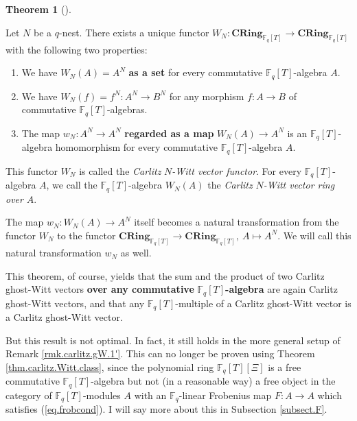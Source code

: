 \documentclass[numbers=enddot,12pt,final,onecolumn,notitlepage]{scrartcl}%
\theoremstyle{definition}
\newtheorem{theo}{Theorem}[section]
\newenvironment{theorem}[1][]
{\begin{theo}[#1]\begin{leftbar}}
{\end{leftbar}\end{theo}}
\begin{document}
\begin{theorem}
\label{thm.carlitz.Witt.class}Let $N$ be a $q$-nest. There exists a unique
functor $W_{N}:\mathbf{CRing}_{\mathbb{F}_{q}\left[  T\right]  }%
\rightarrow\mathbf{CRing}_{\mathbb{F}_{q}\left[  T\right]  }$ with the
following two properties:

\begin{enumerate}
\item We have $W_{N}\left(  A\right)  =A^{N}$ \textbf{as a set} for every
commutative $\mathbb{F}_{q}\left[  T\right]  $-algebra $A$.

\item We have $W_{N}\left(  f\right)  =f^{N}:A^{N}\rightarrow B^{N}$ for any
morphism $f:A\rightarrow B$ of commutative $\mathbb{F}_{q}\left[  T\right]  $-algebras.

\item The map $w_{N}:A^{N}\rightarrow A^{N}$ \textbf{regarded as a map }%
$W_{N}\left(  A\right)  \rightarrow A^{N}$ is an $\mathbb{F}_{q}\left[
T\right]  $-algebra homomorphism for every commutative $\mathbb{F}_{q}\left[
T\right]  $-algebra $A$.
\end{enumerate}

This functor $W_{N}$ is called the \textit{Carlitz }$N$\textit{-Witt vector
functor}. For every $\mathbb{F}_{q}\left[  T\right]  $-algebra $A$, we call
the $\mathbb{F}_{q}\left[  T\right]  $-algebra $W_{N}\left(  A\right)  $ the
\textit{Carlitz }$N$\textit{-Witt vector ring over }$A$.

The map $w_{N}:W_{N}\left(  A\right)  \rightarrow A^{N}$ itself becomes a
natural transformation from the functor $W_{N}$ to the functor $\mathbf{CRing}%
_{\mathbb{F}_{q}\left[  T\right]  }\rightarrow\mathbf{CRing}_{\mathbb{F}%
_{q}\left[  T\right]  },\ A\mapsto A^{N}$. We will call this natural
transformation $w_{N}$ as well.
\end{theorem}

This theorem, of course, yields that the sum and the product of two Carlitz
ghost-Witt vectors \textbf{over any commutative }$\mathbb{F}_{q}\left[
T\right]  $\textbf{-algebra} are again Carlitz ghost-Witt vectors, and that
any $\mathbb{F}_{q}\left[  T\right]  $-multiple of a Carlitz ghost-Witt vector
is a Carlitz ghost-Witt vector.

But this result is not optimal. In fact, it still holds in the more general
setup of Remark \ref{rmk.carlitz.gW.1'}. This can no longer be proven using
Theorem \ref{thm.carlitz.Witt.class}, since the polynomial ring $\mathbb{F}%
_{q}\left[  T\right]  \left[  \Xi\right]  $ is a free commutative
$\mathbb{F}_{q}\left[  T\right]  $-algebra but not (in a reasonable way) a
free object in the category of $\mathbb{F}_{q}\left[  T\right]  $-modules $A$
with an $\mathbb{F}_{q}$-linear Frobenius map $F:A\rightarrow A$ which
satisfies (\ref{eq.frobcond}). I will say more about this in Subsection
\ref{subsect.F}.
\end{document}
